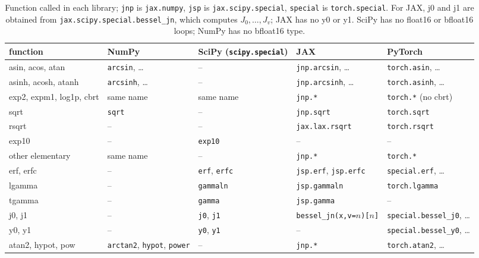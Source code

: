 \documentclass[11pt,a4paper]{article}
\begin{document}
\begin{table}[H]
\centering\footnotesize
\begin{tabularx}{\textwidth}{|>{\raggedright\arraybackslash}p{2.6cm}|>{\raggedright\arraybackslash}X|>{\raggedright\arraybackslash}X|>{\raggedright\arraybackslash}X|>{\raggedright\arraybackslash}X|}
\hline
function & NumPy & SciPy (\texttt{scipy.special}) & JAX & PyTorch \\ \hline
asin, acos, atan & \texttt{arcsin}, \ldots & -- & \texttt{jnp.arcsin}, \ldots & \texttt{torch.asin}, \ldots \\
asinh, acosh, atanh & \texttt{arcsinh}, \ldots & -- & \texttt{jnp.arcsinh}, \ldots & \texttt{torch.asinh}, \ldots \\
exp2, expm1, log1p, cbrt & same name & same name & \texttt{jnp.*} & \texttt{torch.*} (no cbrt) \\
sqrt & \texttt{sqrt} & -- & \texttt{jnp.sqrt} & \texttt{torch.sqrt} \\
rsqrt & -- & -- & \texttt{jax.lax.rsqrt} & \texttt{torch.rsqrt} \\
exp10 & -- & \texttt{exp10} & -- & -- \\
other elementary & same name & -- & \texttt{jnp.*} & \texttt{torch.*} \\
erf, erfc & -- & \texttt{erf}, \texttt{erfc} & \texttt{jsp.erf}, \texttt{jsp.erfc} & \texttt{special.erf}, \ldots \\
lgamma & -- & \texttt{gammaln} & \texttt{jsp.gammaln} & \texttt{torch.lgamma} \\
tgamma & -- & \texttt{gamma} & \texttt{jsp.gamma} & -- \\
j0, j1 & -- & \texttt{j0}, \texttt{j1} & \texttt{bessel\_jn(x,v=$n$)[$n$]} & \texttt{special.bessel\_j0}, \ldots \\
y0, y1 & -- & \texttt{y0}, \texttt{y1} & -- & \texttt{special.bessel\_y0}, \ldots \\
atan2, hypot, pow & \texttt{arctan2}, \texttt{hypot}, \texttt{power} & -- & \texttt{jnp.*} & \texttt{torch.atan2}, \ldots \\
\hline
\end{tabularx}
\caption{Function called in each library; \texttt{jnp} is \texttt{jax.numpy}, \texttt{jsp} is \texttt{jax.scipy.special}, \texttt{special} is \texttt{torch.special}. For JAX, j0 and j1 are obtained from \texttt{jax.scipy.special.bessel\_jn}, which computes $J_0,\ldots,J_v$; JAX has no y0 or y1. SciPy has no float16 or bfloat16 loops; NumPy has no bfloat16 type.}
\label{tab:names}
\end{table}
\end{document}
